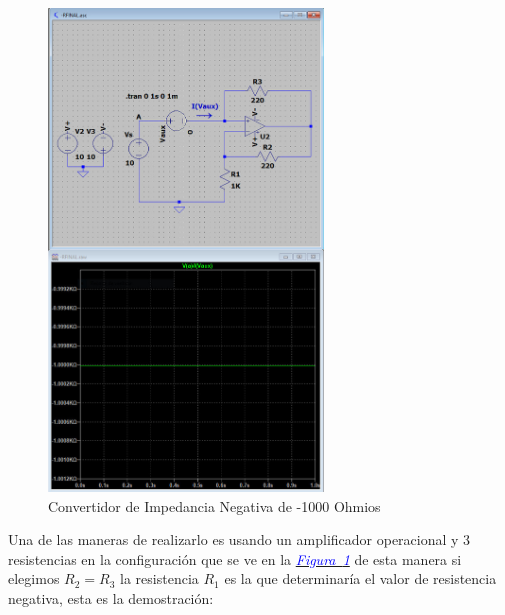 \documentclass[12pt,a4paper]{report} %
\newcommand{\figureref}[1]{\hyperref[#1]{\textcolor{blue}{\textit{Figura~\ref*{#1}}}}}
\begin{document}
	\begin{figure}[h]
		\centering
		\includegraphics[width=0.65\textwidth]{NIC_B.jpg}
		\caption{Convertidor de Impedancia Negativa de -1000 Ohmios}
		\label{fig:NIC}
	\end{figure}
	
	\newpage
	
	Una de las maneras de realizarlo es usando un amplificador operacional y 3 resistencias en la configuración que se ve en la \figureref{fig:NIC} de esta manera si elegimos $R_2=R_3$ la resistencia $R_1$ es la que determinaría el valor de resistencia negativa, esta es la demostración:
	
\end{document}

